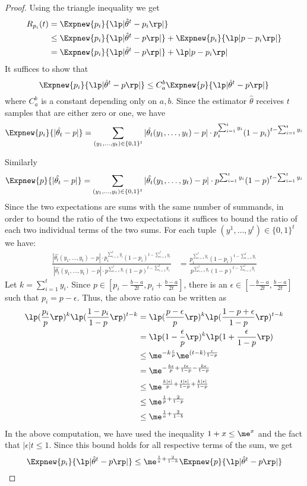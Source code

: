 \begin{proof}
Using the triangle inequality we get
\begin{align*}
R_{p_i}(t) &= \Expnew{p_i}{\lp|\hat{\theta}^t-p_i\rp|}\\
 &\leq \Expnew{p_i}{\lp|\hat{\theta}^t-p\rp|} + \Expnew{p_i}{\lp|p-p_i\rp|}\\
&= \Expnew{p_i}{\lp|\hat{\theta}^t-p\rp|} +\lp|p - p_i\rp|
\end{align*}
It suffices to show that
\[
\Expnew{p_i}{\lp|\hat{\theta}^t-p\rp|} \leq C_a^b \Expnew{p}{\lp|\hat{\theta}^t-p\rp|}
\]
where $C_a^b$ is a constant depending only on $a,b$.
Since the estimator $\hat{\theta}$ receives $t$ samples that are either zero or one, 
we have
\[
\Expnew{p_i}{|\hat{\theta_t} - p|}= \sum_{(y_1,\ldots,y_t)\in
      \{0,1\}^t}|\hat{\theta_t}(y_1,\ldots,y_t) -p| \cdot
    p_i^{\sum_{i=1}^ty_i}(1-p_i)^{t-\sum_{i=1}^ty_i}
\]

Similarly
\[
\Expnew{p}{|\hat{\theta_t} - p|}= \sum_{(y_1,\ldots,y_t)\in
      \{0,1\}^t}|\hat{\theta_t}(y_1,\ldots,y_t) -p| \cdot
    p^{\sum_{i=1}^ty_i}(1-p)^{t-\sum_{i=1}^ty_i}
\]
Since the two expectations are sums with the same number of summands, in order to 
bound the ratio of the two expectations it suffices to 
bound the ratio of each two individual terms of the two sums. 
For each tuple $(y^1,\ldots,y^t)\in\{0,1\}^t$ we have:
\begin{align*}
\frac{|\hat{\theta_t}(y_1,\ldots,y_t) -p| \cdot
    p_i^{\sum_{i=1}^ty_i}(1-p_i)^{t-\sum_{i=1}^ty_i}}
    {|\hat{\theta_t}(y_1,\ldots,y_t) -p| \cdot
    p^{\sum_{i=1}^ty_i}(1-p)^{t-\sum_{i=1}^ty_i}} 
    &= \frac{p_i^{\sum_{i=1}^ty_i}(1-p_i)^{t-\sum_{i=1}^ty_i}}
    {p^{\sum_{i=1}^ty_i}(1-p)^{t-\sum_{i=1}^ty_i}}
\end{align*}
Let $k = \sum_{i=1}^ty_i$.
Since $p \in [p_i -\frac{b-a}{2t},p_i + \frac{b-a}{2t}]$, there is an $\epsilon \in [-\frac{b-a}{2t}, \frac{b-a}{2t}]$ such that $p_i = p - \epsilon$. 
Thus, the above ratio can be written as
\begin{align*}
\lp(\frac{p_i}{p}\rp)^k \lp(\frac{1-p_i}{1-p}\rp)^{t-k} &= 
\lp(\frac{p - \epsilon}{p}\rp)^k \lp(\frac{1-p + \epsilon}{1-p}\rp)^{t-k}\\
&= \lp(1 - \frac{\epsilon}{p}\rp) ^k \lp( 1 + \frac{\epsilon}{1-p}\rp)\\
&\leq \me^{-k\frac{\epsilon}{p}} \me^{(t-k)\frac{\epsilon}{1-p}}\\
&= \me^{-\frac{k\epsilon}{p} + \frac{t\epsilon}{1-p} - \frac{k\epsilon}{1-p}}\\
&\leq \me^{\frac{k|\epsilon|}{p} + \frac{t|\epsilon|}{1-p} + \frac{k|\epsilon|}{1-p}}\\
&\leq \me^{\frac{1}{p} + \frac{2}{1-p}}\\
&\leq \me^{\frac{1}{a} + \frac{2}{1-b}}
\end{align*}
In the above computation, we have used the inequality $1+x \leq \me^x$ and the fact that $|\epsilon|t \leq 1$.
Since this bound holds for all respective terms of the sum, we get
\[
\Expnew{p_i}{\lp|\hat{\theta}^t-p\rp|} \leq \me^{\frac{1}{a} + \frac{2}{1-b}} \Expnew{p}{\lp|\hat{\theta}^t-p\rp|}
\]
\end{proof}


